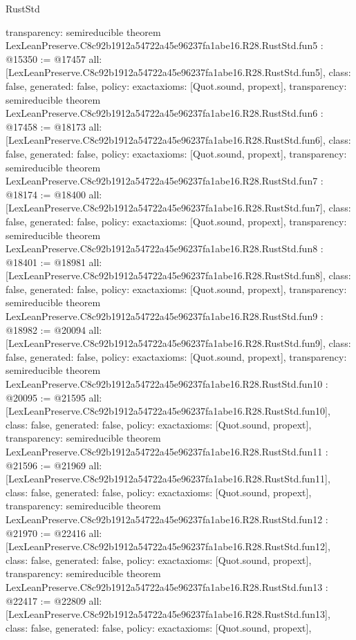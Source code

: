 \begin{lexlean}{RustStd}
\begin{coremodule}
{  transparency: semireducible
}
theorem LexLeanPreserve.C8c92b1912a54722a45e96237fa1abe16.R28.RustStd.fun5 : @15350 := @17457 {
  all: [LexLeanPreserve.C8c92b1912a54722a45e96237fa1abe16.R28.RustStd.fun5],
  class: false,
  generated: false,
  policy: exact{axioms: [Quot.sound, propext]},
  transparency: semireducible
}
theorem LexLeanPreserve.C8c92b1912a54722a45e96237fa1abe16.R28.RustStd.fun6 : @17458 := @18173 {
  all: [LexLeanPreserve.C8c92b1912a54722a45e96237fa1abe16.R28.RustStd.fun6],
  class: false,
  generated: false,
  policy: exact{axioms: [Quot.sound, propext]},
  transparency: semireducible
}
theorem LexLeanPreserve.C8c92b1912a54722a45e96237fa1abe16.R28.RustStd.fun7 : @18174 := @18400 {
  all: [LexLeanPreserve.C8c92b1912a54722a45e96237fa1abe16.R28.RustStd.fun7],
  class: false,
  generated: false,
  policy: exact{axioms: [Quot.sound, propext]},
  transparency: semireducible
}
theorem LexLeanPreserve.C8c92b1912a54722a45e96237fa1abe16.R28.RustStd.fun8 : @18401 := @18981 {
  all: [LexLeanPreserve.C8c92b1912a54722a45e96237fa1abe16.R28.RustStd.fun8],
  class: false,
  generated: false,
  policy: exact{axioms: [Quot.sound, propext]},
  transparency: semireducible
}
theorem LexLeanPreserve.C8c92b1912a54722a45e96237fa1abe16.R28.RustStd.fun9 : @18982 := @20094 {
  all: [LexLeanPreserve.C8c92b1912a54722a45e96237fa1abe16.R28.RustStd.fun9],
  class: false,
  generated: false,
  policy: exact{axioms: [Quot.sound, propext]},
  transparency: semireducible
}
theorem LexLeanPreserve.C8c92b1912a54722a45e96237fa1abe16.R28.RustStd.fun10 : @20095 := @21595 {
  all: [LexLeanPreserve.C8c92b1912a54722a45e96237fa1abe16.R28.RustStd.fun10],
  class: false,
  generated: false,
  policy: exact{axioms: [Quot.sound, propext]},
  transparency: semireducible
}
theorem LexLeanPreserve.C8c92b1912a54722a45e96237fa1abe16.R28.RustStd.fun11 : @21596 := @21969 {
  all: [LexLeanPreserve.C8c92b1912a54722a45e96237fa1abe16.R28.RustStd.fun11],
  class: false,
  generated: false,
  policy: exact{axioms: [Quot.sound, propext]},
  transparency: semireducible
}
theorem LexLeanPreserve.C8c92b1912a54722a45e96237fa1abe16.R28.RustStd.fun12 : @21970 := @22416 {
  all: [LexLeanPreserve.C8c92b1912a54722a45e96237fa1abe16.R28.RustStd.fun12],
  class: false,
  generated: false,
  policy: exact{axioms: [Quot.sound, propext]},
  transparency: semireducible
}
theorem LexLeanPreserve.C8c92b1912a54722a45e96237fa1abe16.R28.RustStd.fun13 : @22417 := @22809 {
  all: [LexLeanPreserve.C8c92b1912a54722a45e96237fa1abe16.R28.RustStd.fun13],
  class: false,
  generated: false,
  policy: exact{axioms: [Quot.sound, propext]},
}
\end{coremodule}
\end{lexlean}
